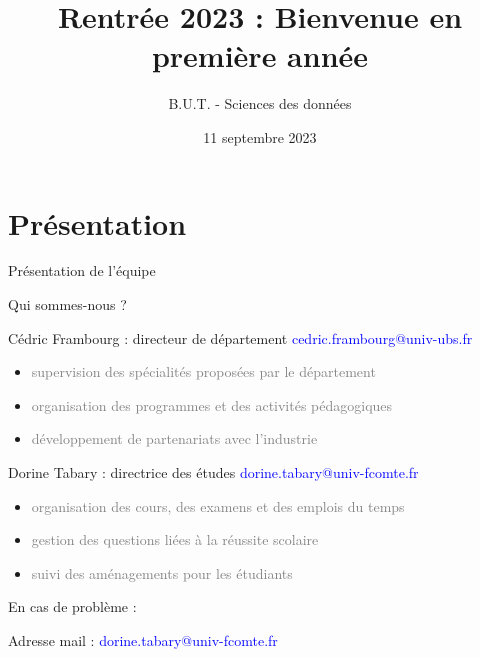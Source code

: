 \documentclass [xcolor=x11names,t] {beamer}
\title[Rentrée 2023]{Rentrée 2023 : Bienvenue en première année }
\institute[]{%
}
\author[Dorine Tabary, Cédric Frambourg]{
	B.U.T. - Sciences des données}
\date{11 septembre 2023 }
\begin{document}
\begin{frame}
\maketitle
\end{frame}



\section{Présentation}
\begin{frame}{Présentation de l'équipe}
\begin{block}{Qui sommes-nous ?}


Cédric Frambourg : directeur de département \textcolor{blue}{cedric.frambourg@univ-ubs.fr}    

\begin{itemize}
    \item \textcolor{gray}{supervision des spécialités proposées par le département}
    \item \textcolor{gray}{organisation des programmes et des activités pédagogiques}
   \item  \textcolor{gray}{développement de partenariats avec l'industrie}
\end{itemize}

Dorine Tabary : directrice des études \textcolor{blue}{dorine.tabary@univ-fcomte.fr}

\begin{itemize}
    \item \textcolor{gray}{organisation des cours, des examens et des emplois du temps}
    \item \textcolor{gray}{gestion des questions liées à la réussite scolaire}
    \item \textcolor{gray}{suivi des aménagements pour les étudiants}
\end{itemize}
\end{block}

\begin{alertblock}{En cas de problème :}

Adresse mail : \textcolor{blue}{dorine.tabary@univ-fcomte.fr}
\end{alertblock}


\end{frame}
\end{document}
